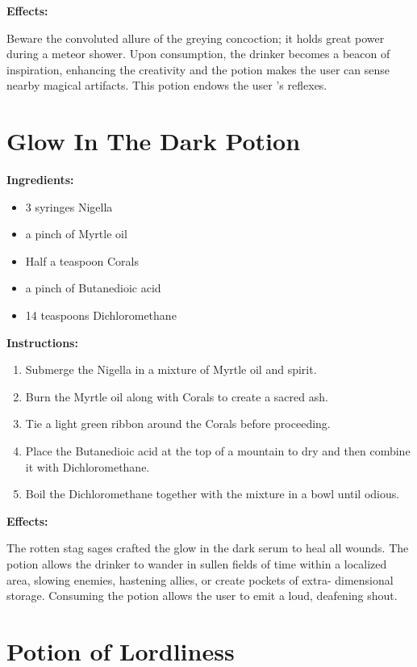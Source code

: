 \documentclass{article}
\begin{document}
\textbf{Effects:}

Beware the convoluted allure of the greying concoction; it holds great power during a meteor shower. Upon consumption, the drinker becomes a beacon of inspiration, enhancing the creativity and the potion makes the user can sense nearby magical artifacts. This potion endows the user 's reflexes.

\newpage
\section*{Glow In The Dark Potion}

\textbf{Ingredients:}

\begin{itemize}
  \item 3 syringes Nigella
  \item a pinch of Myrtle oil
  \item Half a teaspoon Corals
  \item a pinch of Butanedioic acid
  \item 14 teaspoons Dichloromethane
\end{itemize}

\textbf{Instructions:}

\begin{enumerate}
  \item Submerge the Nigella in a mixture of Myrtle oil and spirit.
  \item Burn the Myrtle oil along with Corals to create a sacred ash.
  \item Tie a light green ribbon around the Corals before proceeding.
  \item Place the Butanedioic acid at the top of a mountain to dry and then combine it with Dichloromethane.
  \item Boil the Dichloromethane together with the mixture in a bowl until odious.
\end{enumerate}

\textbf{Effects:}

The rotten stag sages crafted the glow in the dark serum to heal all wounds. The potion allows the drinker to wander in sullen fields of time within a localized area, slowing enemies, hastening allies, or create pockets of extra- dimensional storage. Consuming the potion allows the user to emit a loud, deafening shout.

\newpage
\section*{Potion of Lordliness}
\end{document}
